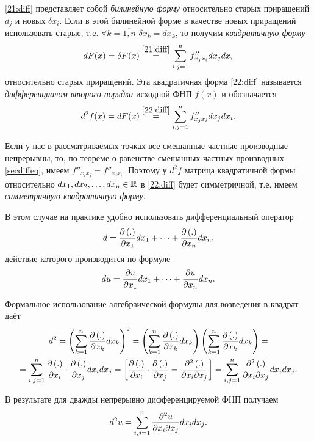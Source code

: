 \documentclass[../../main.tex]{subfiles}
\begin{document}
	\eqref{21:diff} представляет собой \emph{билинейную форму} относительно 
	старых приращений $d_j$ и новых $\delta x_i$. Если в этой билинейной форме 
	в качестве новых приращений использовать старые, т.е. 
	$\forall k = \overline{1, n}$ $\delta x_k = dx_k$, то получим 
	\emph{квадратичную форму}
	\begin{equation}
		dF(x) = \delta F(x) \overset{\eqref{21:diff}}{=} 
		\sum_{i, j = 1}^nf''_{x_jx_i}dx_jdx_i
		\label{22:diff}
	\end{equation}
	относительно старых приращений. Эта квадратичная форма \eqref{22:diff} 
	называется \emph{дифференциалом второго порядка} исходной ФНП $f(x)$ 
	и обозначается
	\[d^2f(x) = dF(x) \overset{\eqref{22:diff}}{=} 
	\sum_{i, j = 1}^nf''_{x_jx_i}dx_jdx_i.\]
		
	Если у нас в рассматриваемых точках все смешанные частные производные 
	непрерывны, то, по теореме о равенстве смешанных частных производных 
	\eqref{secdiffeq}, имеем $f''_{x_ix_j} = f''_{x_jx_i}$. Поэтому у $d^2f$ 
	матрица квадратичной формы относительно $dx_1, dx_2,\dots, dx_n\in\mathbb{R}$ в 
	\eqref{22:diff} будет симметричной, т.е. имеем 
	\emph{симметричную квадратичную форму}.
	
	В этом случае на практике удобно использовать дифференциальный оператор
	\begin{equation}
		d = \frac{\partial \left(.\right)}{\partial x_1}dx_1 + \dots + 
		\frac{\partial \left(.\right)}{\partial x_n}dx_n,
		\label{23:diff}
	\end{equation}
	действие которого производится по формуле
	\[du = \frac{\partial u}{\partial x_1}dx_1 + \dots + \frac{\partial u}{\partial x_n}dx_n.\]
	
	Формальное использование алгебраической формулы для возведения в квадрат 
	даёт
	\begin{gather*}
		d^2 = \left(\sum_{k = 1}^n\frac{\partial \left(.\right)}{\partial x_k}dx_k\right)^2 = 
		\left(\sum_{k = 1}^n\frac{\partial \left(.\right)}{\partial x_k}dx_k\right)
		\left(\sum_{k = 1}^n\frac{\partial \left(.\right)}{\partial x_k}dx_k\right) = \\
		= \sum_{i, j = 1}^n\frac{\partial \left(.\right)}{\partial x_i}\cdot
		\frac{\partial \left(.\right)}{\partial x_j}dx_idx_j = \left[\begin{aligned}
			\frac{\partial \left(.\right)}{\partial x_i}\cdot\frac{\partial \left(.\right)}{\partial x_j} = 
			\frac{\partial ^2\left(.\right)}{\partial x_i\partial x_j}
		\end{aligned}\right] = 
		\sum_{i, j = 1}^n\frac{\partial ^2\left(.\right)}{\partial x_i\partial x_j}dx_idx_j.
	\end{gather*}
	
	В результате для дважды непрерывно дифференцируемой ФНП получаем
	\[d^2u = \sum_{i, j = 1}^n\frac{\partial ^2u}{\partial x_i\partial x_j}dx_idx_j.\]
	
\end{document}
